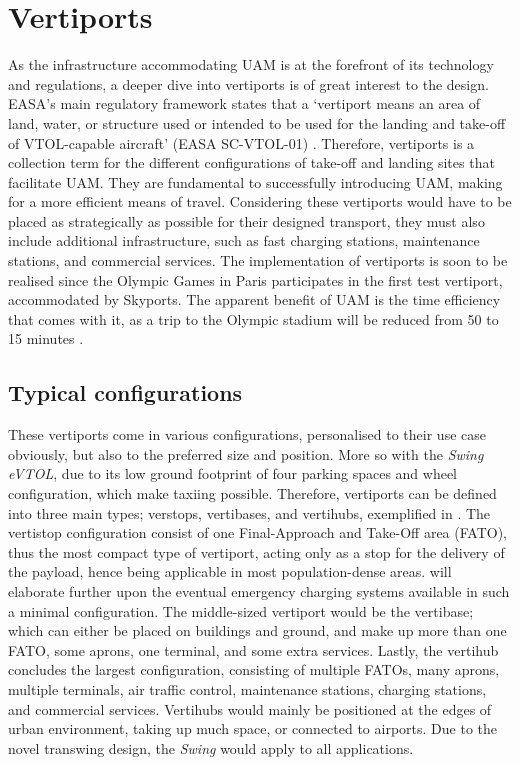 \section{Vertiports}
\label{sec:Vertiports}
As the infrastructure accommodating UAM is at the forefront of its technology and regulations, a deeper dive into vertiports is of great interest to the design.
EASA’s main regulatory framework states that a \enquote*{vertiport means an area of land, water, or structure used or intended to be used for the landing and take-off of VTOL-capable aircraft} (EASA SC-VTOL-01) \cite{easa2022vertiports}.
Therefore, vertiports is a collection term for the different configurations of take-off and landing sites that facilitate UAM.
They are fundamental to successfully introducing UAM, making for a more efficient means of travel.
Considering these vertiports would have to be placed as strategically as possible for their designed transport, they must also include additional infrastructure, such as fast charging stations, maintenance stations, and commercial services.
The implementation of vertiports is soon to be realised since the Olympic Games in Paris participates in the first test vertiport, accommodated by Skyports.
The apparent benefit of UAM is the time efficiency that comes with it, as a trip to the Olympic stadium will be reduced from 50 to 15 minutes \cite{rijksoverheid_vertiports}.
\subsection{Typical configurations}
These vertiports come in various configurations, personalised to their use case obviously, but also to the preferred size and position.
More so with the \textit{Swing eVTOL}, due to its low ground footprint of four parking spaces and wheel configuration, which make taxiing possible.
Therefore, vertiports can be defined into three main types; verstops, vertibases, and vertihubs, exemplified in .
The vertistop configuration consist of one Final-Approach and Take-Off area (FATO), thus the most compact type of vertiport, acting only as a stop for the delivery of the payload, hence being applicable in most population-dense areas.
 will elaborate further upon the eventual emergency charging systems available in such a minimal configuration.
The middle-sized vertiport would be the vertibase; which can either be placed on buildings and ground, and make up more than one FATO, some aprons, one terminal, and some extra services.
Lastly, the vertihub concludes the largest configuration, consisting of multiple FATOs, many aprons, multiple terminals, air traffic control, maintenance stations, charging stations, and commercial services.
Vertihubs would mainly be positioned at the edges of urban environment, taking up much space, or connected to airports.
Due to the novel transwing design, the \textit{Swing} would apply to all applications.

